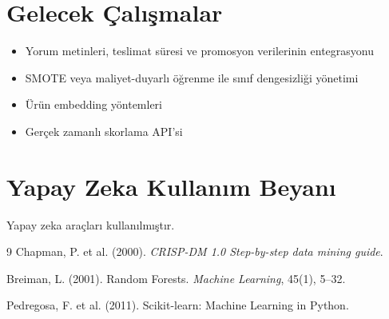 \documentclass[12pt,a4paper]{report}
\begin{document}
\chapter{Gelecek Çalışmalar}
\begin{itemize}
    \item Yorum metinleri, teslimat süresi ve promosyon verilerinin entegrasyonu
    \item SMOTE veya maliyet-duyarlı öğrenme ile sınıf dengesizliği yönetimi
    \item Ürün embedding yöntemleri
    \item Gerçek zamanlı skorlama API'si
\end{itemize}

\chapter{Yapay Zeka Kullanım Beyanı}
Yapay zeka araçları kullanılmıştır.

\begin{thebibliography}{9}
Chapman, P. et al. (2000). \textit{CRISP-DM 1.0 Step-by-step data mining guide}.

Breiman, L. (2001). Random Forests. \textit{Machine Learning}, 45(1), 5--32.

Pedregosa, F. et al. (2011). Scikit-learn: Machine Learning in Python.
\end{thebibliography}
\end{document}
